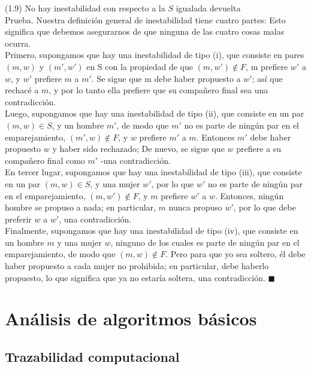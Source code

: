 \documentclass[a4paper]{article}
\begin{document}
(1.9) No hay inestabilidad con respecto a la $S$ igualada devuelta\\

Prueba. Nuestra definición general de inestabilidad tiene cuatro partes: Esto significa que debemos asegurarnos de que ninguna de las cuatro cosas malas ocurra.\\

Primero, supongamos que hay una inestabilidad de tipo (i), que consiste en pares $(m,w)$ y $(m',w')$ en S con la propiedad de que $(m,w')∉F$, m prefiere $w'$ a $w$, y $w'$ prefiere $m$ a $m'$. Se sigue que m debe haber propuesto a $w'$; así que rechacé a $m$, y por lo tanto ella prefiere que su compañero final sea una contradicción.\\

Luego, supongamos que hay una inestabilidad de tipo (ii), que consiste en un par $(m,w) \in S$, y un hombre $m'$, de modo que $m'$ no es parte de ningún par en el emparejamiento, $(m',w)∉F$, y $w$ prefiere $m'$ a $m$. Entonces $m'$ debe haber propuesto $w$ y haber sido rechazado; De nuevo, se sigue que $w$ prefiere a su compañero final como $m'$ -una contradicción.\\

En tercer lugar, supongamos que hay una inestabilidad de tipo (iii), que consiste en un par $(m,w) \in S$, y una mujer $w'$, por lo que $w'$ no es parte de ningún par en el emparejamiento, $(m,w')∉F$, y $m$ prefiere $w'$ a $w$. Entonces, ningún hombre se propuso a nada; en particular, $m$ nunca propuso $w'$, por lo que debe preferir $w$ a $w'$, una contradicción.\\

Finalmente, supongamos que hay una inestabilidad de tipo (iv), que consiste en un hombre $m$ y una mujer $w$, ninguno de los cuales es parte de ningún par en el emparejamiento, de modo que $(m,w)∉F$. Pero para que yo sea soltero, él debe haber propuesto a cada mujer no prohibida; en particular, debe haberlo propuesto, lo que significa que ya no estaría soltera, una contradicción. $ \blacksquare $\\


\newpage

\section{Análisis de algoritmos básicos}

\subsection{Trazabilidad computacional}
\end{document}
